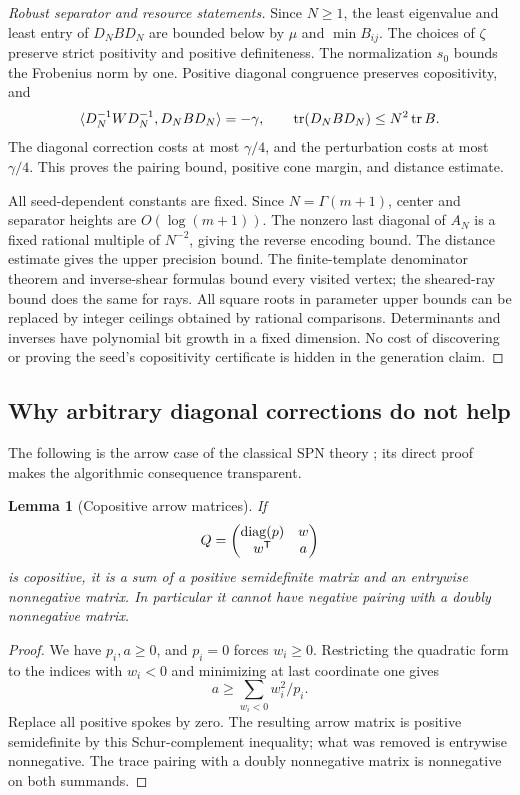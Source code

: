\documentclass[11pt]{article}
\newtheorem{lemma}[theorem]{Lemma}
\theoremstyle{definition}\newtheorem{definition}[theorem]{Definition}
\theoremstyle{remark}\newtheorem{remark}[theorem]{Remark}
\newcommand{\T}{^{\mathsf T}}\newcommand{\norm}[1]{\lVert #1\rVert}
\begin{document}
\begin{proof}[Robust separator and resource statements]
Since $N\ge1$, the least eigenvalue and least entry of $D_NBD_N$ are bounded below by $\mu$ and $\min B_{ij}$. The choices of $\zeta$ preserve strict positivity and positive definiteness. The normalization $s_0$ bounds the Frobenius norm by one. Positive diagonal congruence preserves copositivity, and
\[
 \langle D_N^{-1}WD_N^{-1},D_NBD_N\rangle=-\gamma,
 \qquad \operatorname{tr}(D_NBD_N)\le N^2\operatorname{tr} B.
\]
The diagonal correction costs at most $\gamma/4$, and the perturbation costs at most $\gamma/4$. This proves the pairing bound, positive cone margin, and distance estimate.

All seed-dependent constants are fixed. Since $N=\Gamma(m+1)$, center and separator heights are $O(\log(m+1))$. The nonzero last diagonal of $A_N$ is a fixed rational multiple of $N^{-2}$, giving the reverse encoding bound. The distance estimate gives the upper precision bound. The finite-template denominator theorem and inverse-shear formulas bound every visited vertex; the sheared-ray bound does the same for rays. All square roots in parameter upper bounds can be replaced by integer ceilings obtained by rational comparisons. Determinants and inverses have polynomial bit growth in a fixed dimension. No cost of discovering or proving the seed's copositivity certificate is hidden in the generation claim.
\end{proof}

\subsection{Why arbitrary diagonal corrections do not help}
The following is the arrow case of the classical SPN theory \cite[Theorem 5.4]{SPN}; its direct proof makes the algorithmic consequence transparent.

\begin{lemma}[Copositive arrow matrices]\label{lem:arrow}
If
\[
 Q=\begin{pmatrix}\diag(p)&w\\w\T&a\end{pmatrix}
\]
is copositive, it is a sum of a positive semidefinite matrix and an entrywise nonnegative matrix. In particular it cannot have negative pairing with a doubly nonnegative matrix.
\end{lemma}
\begin{proof}
We have $p_i,a\ge0$, and $p_i=0$ forces $w_i\ge0$. Restricting the quadratic form to the indices with $w_i<0$ and minimizing at last coordinate one gives
\[
 a\ge\sum_{w_i<0} w_i^2/p_i.
\]
Replace all positive spokes by zero. The resulting arrow matrix is positive semidefinite by this Schur-complement inequality; what was removed is entrywise nonnegative. The trace pairing with a doubly nonnegative matrix is nonnegative on both summands.
\end{proof}
\end{document}
